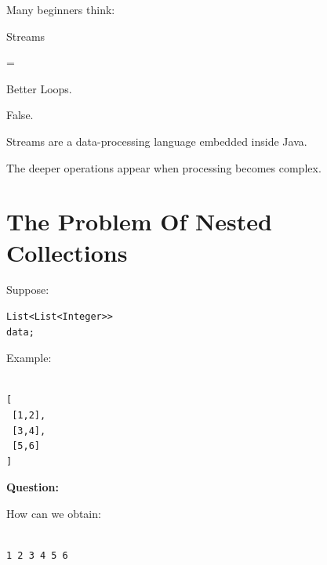 \documentclass[11pt,a4paper]{book}
\begin{document}
\begin{trap}

Many beginners think:


Streams

=

Better Loops.


False.


Streams are a data-processing
language embedded inside Java.


The deeper operations appear
when processing becomes complex.

\end{trap}


\section{The Problem Of Nested Collections}

Suppose:

\begin{verbatim} 
List<List<Integer>>
data;
\end{verbatim}


Example:

\begin{verbatim}

[
 [1,2],
 [3,4],
 [5,6]
]

\end{verbatim}


\textbf{Question:}


How can we obtain:

\begin{verbatim}

1 2 3 4 5 6

\end{verbatim}
\end{document}

